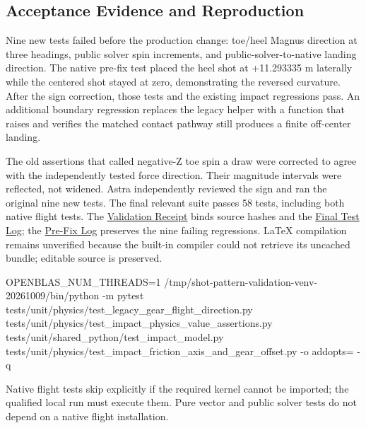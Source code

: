 \documentclass[
]{article}
\newenvironment{Shaded}{}{}
\newcommand{\AttributeTok}[1]{\textcolor[rgb]{0.49,0.56,0.16}{#1}}
\newcommand{\ExtensionTok}[1]{#1}
\newcommand{\NormalTok}[1]{#1}
\newcommand{\OperatorTok}[1]{\textcolor[rgb]{0.40,0.40,0.40}{#1}}
\newcommand{\StringTok}[1]{\textcolor[rgb]{0.25,0.44,0.63}{#1}}
\newcommand{\VariableTok}[1]{\textcolor[rgb]{0.10,0.09,0.49}{#1}}
\begin{document}
\subsection{Acceptance Evidence and
Reproduction}\label{acceptance-evidence-and-reproduction}

Nine new tests failed before the production change: toe/heel Magnus
direction at three headings, public solver spin increments, and
public-solver-to-native landing direction. The native pre-fix test
placed the heel shot at +11.293335 m laterally while the centered shot
stayed at zero, demonstrating the reversed curvature. After the sign
correction, those tests and the existing impact regressions pass. An
additional boundary regression replaces the legacy helper with a
function that raises and verifies the matched contact pathway still
produces a finite off-center landing.

The old assertions that called negative-Z toe spin a draw were corrected
to agree with the independently tested force direction. Their magnitude
intervals were reflected, not widened. Astra independently reviewed the
sign and ran the original nine new tests. The final relevant suite
passes 58 tests, including both native flight tests. The
\href{LEGACY_GEAR_SIGN_VALIDATION.json}{Validation Receipt} binds source
hashes and the \href{LEGACY_GEAR_SIGN_TESTS.txt}{Final Test Log}; the
\href{LEGACY_GEAR_SIGN_RED.txt}{Pre-Fix Log} preserves the nine failing
regressions. LaTeX compilation remains unverified because the built-in
compiler could not retrieve its uncached bundle; editable source is
preserved.

\begin{Shaded}
\begin{Highlighting}[]
\VariableTok{OPENBLAS\_NUM\_THREADS}\OperatorTok{=}\NormalTok{1 }\ExtensionTok{/tmp/shot{-}pattern{-}validation{-}venv{-}20261009/bin/python} \AttributeTok{{-}m}\NormalTok{ pytest tests/unit/physics/test\_legacy\_gear\_flight\_direction.py tests/unit/physics/test\_impact\_physics\_value\_assertions.py tests/unit/shared\_python/test\_impact\_model.py tests/unit/physics/test\_impact\_friction\_axis\_and\_gear\_offset.py }\AttributeTok{{-}o}\NormalTok{ addopts=}\StringTok{\textquotesingle{}\textquotesingle{}} \AttributeTok{{-}q}
\end{Highlighting}
\end{Shaded}

Native flight tests skip explicitly if the required kernel cannot be
imported; the qualified local run must execute them. Pure vector and
public solver tests do not depend on a native flight installation.
\end{document}

